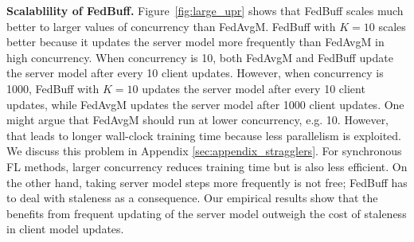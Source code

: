 \documentclass[twoside]{article}
\newcommand{\algname}{{FedBuff}\xspace}
\newcommand{\concurrency}{{concurrency}\xspace}
\newcommand{\syncfl}{{SyncFL}\xspace}
\begin{document}
\textbf{Scalablility of \algname{}.}
Figure~\ref{fig:large_upr} shows that \algname{} scales much better to larger values of \concurrency{} than FedAvgM. \algname{} with $K=10$ scales better because it updates the server model more frequently than FedAvgM in high concurrency. When \concurrency{} is 10, both FedAvgM and \algname{} update the server model after every 10 client updates. However, when \concurrency{} is 1000, \algname{} with $K=10$ updates the server model after every 10 client updates, while FedAvgM updates the server model after 1000 client updates. One might argue that FedAvgM should run at lower concurrency, e.g. 10. However, that leads to longer wall-clock training time because less parallelism is exploited. We discuss this problem in Appendix \ref{sec:appendix_stragglers}. For synchronous FL methods, larger concurrency reduces training time but is also less efficient.
On the other hand, taking server model steps more frequently is not free; \algname{} has to deal with staleness as a consequence. Our empirical results show that the benefits from frequent updating of the server model outweigh the cost of staleness in client model updates. 


\end{document}
